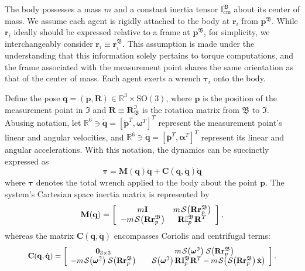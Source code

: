 The body possesses a mass $m$ and a constant inertia tensor $\mathbb{I}_\text{cm}^\mathfrak{B}$ about its center of mass. We assume each agent is rigidly attached to the body at $\mathbf{r}_i$ from $\mathbf{p}^\mathfrak{B}$. While $\mathbf{r}_i$ ideally should be expressed relative to a frame at $\mathbf{p}^\mathfrak{B}$, for simplicity, we interchangeably consider $\mathbf{r}_i\equiv \mathbf{r}_i^\mathfrak{B}$. This assumption is made under the understanding that this information solely pertains to torque computations, and the frame associated with the measurement point shares the same orientation as that of the center of mass. Each agent exerts a wrench $\boldsymbol{\tau}_i$ onto the body.

Define the pose $\mathbf{q} = (\mathbf{p}, \mathbf{R}) \in \mathbb{R}^3\times \text{SO}(3)$, where $\mathbf{p}$ is the position of the measurement point in $\mathfrak{I}$ and $\mathbf{R}\equiv \mathbf{R}_\mathfrak{B}^\mathfrak{I}$ is the rotation matrix from $\mathfrak{B}$ to $\mathfrak{I}$. Abusing notation, let $\mathbb{R}^6\ni\dot{\mathbf{q}} = \left[\dot{\mathbf{p}}^T, \boldsymbol{\omega}^T \right]^T$ represent the measurement point's linear and angular velocities, and $\mathbb{R}^6\ni\ddot{\mathbf{q}} = \left[\ddot{\mathbf{p}}^T, \boldsymbol{\alpha}^T \right]^T$ represent its linear and angular accelerations. With this notation, the dynamics can be succinctly expressed as \citep{Culbertson2021}
\begin{equation}
    \boldsymbol{\tau } = \mathbf {M}(\mathbf {q})\ddot{\mathbf {q}} + \mathbf {C}(\mathbf {q},\dot{\mathbf {q}})\dot{\mathbf {q}} \label{eq:tau}
\end{equation}
where $\boldsymbol{\tau }$ denotes the total wrench applied to the body about the point $\mathbf{p}$. The system's Cartesian space inertia matrix is represented by
\begin{equation}
    \mathbf {M}(\mathbf {q}) = \left[\begin{array}{cc}m\mathbf {I} & m\SL[\mathbf {R} \mathbf {r}_p^\mathfrak{B}] \\ -m\SL[\mathbf {R} \mathbf {r}_p^\mathfrak{B}] & \mathbf {R} \mathbb{I}_p^\mathfrak{B} \mathbf {R}^T \end{array} \right],\label{eq:Mcartesian}
\end{equation}
whereas the matrix $\mathbf {C}(\mathbf {q},\dot{\mathbf {q}})$ encompasses Coriolis and centrifugal terms:
\begin{equation}
\resizebox{0.88\columnwidth}{!}{$%
    \mathbf {C}(\mathbf {q},\dot{\mathbf {q}}) = \left[\begin{array}{cc}\boldsymbol{0}_{3\times3} & m\SL[\boldsymbol{\omega }^\mathfrak{I}] \SL[\mathbf {R} \mathbf {r}_p^\mathfrak{B}] \\ -m\SL[\boldsymbol{\omega }^\mathfrak{I}]\SL[\mathbf {R} \mathbf {r}_p^\mathfrak{B}] & \quad\SL[\boldsymbol{\omega }^\mathfrak{I}] \mathbf {R}\mathbb{I}_p^\mathfrak{B}\mathbf {R}^T 
    -m\SL[\SL[\mathbf {R}\mathbf {r}_p^\mathfrak{B}] \dot{\mathbf {x}}] \end{array} \right]. \label{eq:C}
$%
}
\end{equation}
